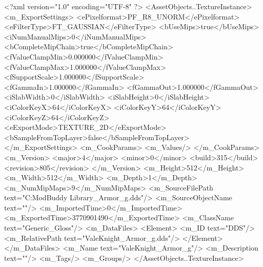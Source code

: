 <?xml version="1.0" encoding="UTF-8" ?>
<AssetObjects..TextureInstance>
	<m_ExportSettings>
		<ePixelformat>PF_R8_UNORM</ePixelformat>
		<eFilterType>FT_GAUSSIAN</eFilterType>
		<bUseMips>true</bUseMips>
		<iNumManualMips>0</iNumManualMips>
		<bCompleteMipChain>true</bCompleteMipChain>
		<fValueClampMin>0.000000</fValueClampMin>
		<fValueClampMax>1.000000</fValueClampMax>
		<fSupportScale>1.000000</fSupportScale>
		<fGammaIn>1.000000</fGammaIn>
		<fGammaOut>1.000000</fGammaOut>
		<iSlabWidth>0</iSlabWidth>
		<iSlabHeight>0</iSlabHeight>
		<iColorKeyX>64</iColorKeyX>
		<iColorKeyY>64</iColorKeyY>
		<iColorKeyZ>64</iColorKeyZ>
		<eExportMode>TEXTURE_2D</eExportMode>
		<bSampleFromTopLayer>false</bSampleFromTopLayer>
	</m_ExportSettings>
	<m_CookParams>
		<m_Values/>
	</m_CookParams>
	<m_Version>
		<major>4</major>
		<minor>0</minor>
		<build>315</build>
		<revision>805</revision>
	</m_Version>
	<m_Height>512</m_Height>
	<m_Width>512</m_Width>
	<m_Depth>1</m_Depth>
	<m_NumMipMaps>9</m_NumMipMaps>
	<m_SourceFilePath text="C:\Users\Furion\Documents\Firaxis ModBuddy Library\Arryn\ValeKnight\ValeKnight_Armor_g.dds"/>
	<m_SourceObjectName text=""/>
	<m_ImportedTime>0</m_ImportedTime>
	<m_ExportedTime>3770901490</m_ExportedTime>
	<m_ClassName text="Generic_Gloss"/>
	<m_DataFiles>
		<Element>
			<m_ID text="DDS"/>
			<m_RelativePath text="ValeKnight_Armor_g.dds"/>
		</Element>
	</m_DataFiles>
	<m_Name text="ValeKnight_Armor_g"/>
	<m_Description text=""/>
	<m_Tags/>
	<m_Groups/>
</AssetObjects..TextureInstance>

